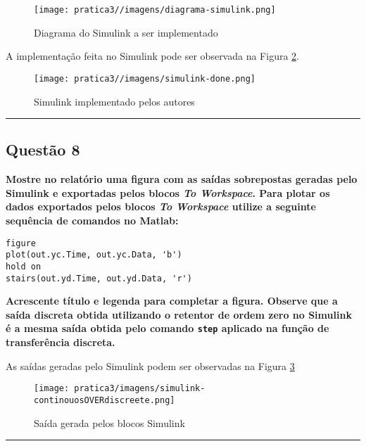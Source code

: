 \begin{figure}[H]
    \centering
    \texttt{[image: pratica3//imagens/diagrama-simulink.png]}
    \caption{Diagrama do Simulink a ser implementado}
    \label{fig:simulink-goal}
\end{figure}

A implementação feita no Simulink pode ser observada na Figura \ref{fig:simulink-done}.

\begin{figure}[H]
    \centering
    \texttt{[image: pratica3//imagens/simulink-done.png]}
    \caption{Simulink implementado pelos autores}
    \label{fig:simulink-done}
\end{figure}

\vspace{10pt}
\hrule

\subsection{Questão 8}
\textbf{Mostre no relatório uma figura com as saídas sobrepostas geradas pelo Simulink e exportadas pelos blocos \textit{To Workspace}. Para plotar os dados exportados pelos blocos \textit{To Workspace} utilize a seguinte sequência de comandos no Matlab:}
\begin{verbatim}
figure
plot(out.yc.Time, out.yc.Data, 'b')
hold on
stairs(out.yd.Time, out.yd.Data, 'r')
\end{verbatim}
\textbf{Acrescente título e legenda para completar a figura. Observe que a saída discreta obtida utilizando o retentor de ordem zero no Simulink é a mesma saída obtida pelo comando \texttt{step} aplicado na função de transferência discreta.}

As saídas geradas pelo Simulink podem ser observadas na Figura \ref{fig:simulink-continous-discreete}

\begin{figure}[H]
    \centering
    \texttt{[image: pratica3/imagens/simulink-continouosOVERdiscreete.png]}
    \caption{Saída gerada pelos blocos Simulink}
    \label{fig:simulink-continous-discreete}
\end{figure}

\vspace{10pt}
\hrule
